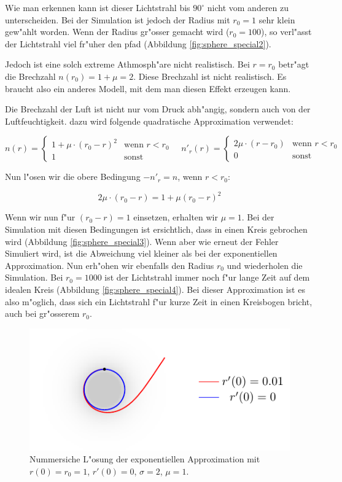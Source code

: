 \begin{refsection}
Wie man erkennen kann ist dieser Lichtstrahl bis $90^\circ$ nicht vom anderen zu unterscheiden.
Bei der Simulation ist jedoch der Radius mit $r_0=1$ sehr klein gew"ahlt worden. 
Wenn der Radius gr"osser gemacht wird ($r_0 = 100$), so  verl"asst der Lichtstrahl viel fr"uher den pfad (Abbildung \ref{fig:sphere_special2}). 

Jedoch ist eine solch extreme Athmosph"are nicht realistisch. 
Bei $r = r_0$ betr"agt die Brechzahl $n(r_0) = 1 + \mu = 2$. 
Diese Brechzahl ist nicht realistisch. 
Es braucht also ein anderes Modell, mit dem man diesen Effekt erzeugen kann.

Die Brechzahl der Luft ist nicht nur vom Druck abh"angig, sondern auch von der Luftfeuchtigkeit. 
dazu wird folgende quadratische Approximation verwendet:

$$n(r) = \left\{ \begin{array}{ll} 1 + \mu \cdot (r_0 - r)^2 & \text{wenn } r < r_0 \\ 1 & \text{sonst} \end{array} \right. \quad n'_r(r) = \left\{ \begin{array}{ll} 2\mu \cdot (r - r_0) & \text{wenn } r < r_0 \\ 0 & \text{sonst} \end{array} \right.$$

Nun l"osen wir die obere Bedingung $-n'_r = n $, wenn $r < r_0$:

$$2\mu \cdot (r_0 - r) = 1 + \mu(r_0 - r)^2$$

Wenn wir nun f"ur $(r_0 - r) = 1$ einsetzen, erhalten wir $\mu = 1$. 
Bei der Simulation mit diesen Bedingungen ist ersichtlich, dass in einen Kreis gebrochen wird (Abbildung \ref{fig:sphere_special3}). 
Wenn aber wie erneut der Fehler Simuliert wird, ist die Abweichung viel kleiner als bei der exponentiellen Approximation. 
Nun erh"ohen wir ebenfalls den Radius $r_0$ und wiederholen die Simulation. 
Bei $r_0 = 1000$ ist der Lichtstrahl immer noch f"ur lange Zeit auf dem idealen Kreis (Abbildung \ref{fig:sphere_special4}). 
Bei dieser Approximation ist es also m"oglich, dass sich ein Lichtstrahl f"ur kurze Zeit in einen Kreisbogen bricht, auch bei gr"osserem $r_0$.

\begin{figure}
  \centering
  \includegraphics[scale=1]{licht/standalone/fig_kreis_exp1.pdf} 
  \caption{Nummersiche L"osung der exponentiellen Approximation mit $r(0) = r_0 = 1$, $r'(0) = 0$, $\sigma = 2$, $\mu = 1$. \label{fig:sphere_special1}}


\end{figure}
\end{refsection}
